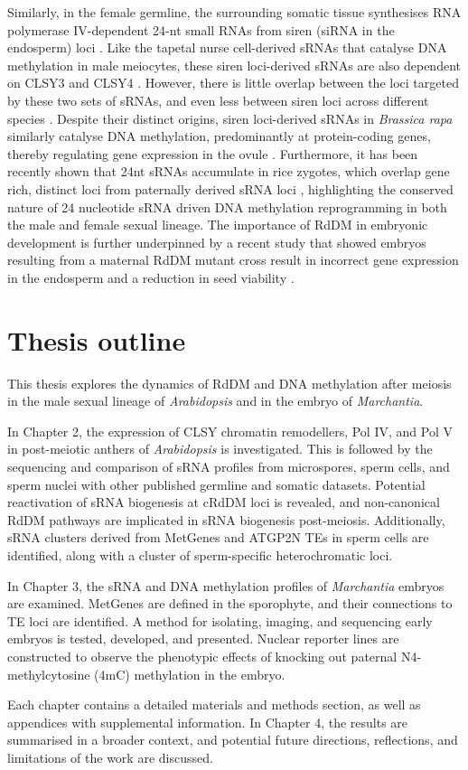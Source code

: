 Similarly, in the female germline, the surrounding somatic tissue synthesises RNA polymerase IV-dependent 24-nt small RNAs from siren (siRNA in the endosperm) loci \citep{RN164,RN163,RN162}. Like the tapetal nurse cell-derived sRNAs that catalyse DNA methylation in male meiocytes, these siren loci-derived sRNAs are also dependent on CLSY3 and CLSY4 \citep{RN162}. However, there is little overlap between the loci targeted by these two sets of sRNAs, and even less between siren loci across different species \citep{RN163}. Despite their distinct origins, siren loci-derived sRNAs in \textit{Brassica rapa} similarly catalyse DNA methylation, predominantly at protein-coding genes, thereby regulating gene expression in the ovule \citep{RN165}. Furthermore, it has been recently shown that 24nt sRNAs accumulate in rice zygotes, which overlap gene rich, distinct loci from paternally derived sRNA loci \citep{RN166}, highlighting the conserved nature of 24 nucleotide sRNA driven DNA methylation reprogramming in both the male and female sexual lineage. The importance of RdDM in embryonic development is further underpinned by a recent study that showed embryos resulting from a maternal RdDM mutant cross result in incorrect gene expression in the endosperm and a reduction in seed viability \citep{RN167}.

\section{Thesis outline}

This thesis explores the dynamics of RdDM and DNA methylation after meiosis in the male sexual lineage of \textit{Arabidopsis} and in the embryo of \textit{Marchantia}.

In Chapter 2, the expression of CLSY chromatin remodellers, Pol IV, and Pol V in post-meiotic anthers of \textit{Arabidopsis} is investigated. This is followed by the sequencing and comparison of sRNA profiles from microspores, sperm cells, and sperm nuclei with other published germline and somatic datasets. Potential reactivation of sRNA biogenesis at cRdDM loci is revealed, and non-canonical RdDM pathways are implicated in sRNA biogenesis post-meiosis. Additionally, sRNA clusters derived from MetGenes and ATGP2N TEs in sperm cells are identified, along with a cluster of sperm-specific heterochromatic loci.

In Chapter 3, the sRNA and DNA methylation profiles of \textit{Marchantia} embryos are examined. MetGenes are defined in the sporophyte, and their connections to TE loci are identified. A method for isolating, imaging, and sequencing early embryos is tested, developed, and presented. Nuclear reporter lines are constructed to observe the phenotypic effects of knocking out paternal N4-methylcytosine (4mC) methylation in the embryo.

Each chapter contains a detailed materials and methods section, as well as appendices with supplemental information. In Chapter 4, the results are summarised in a broader context, and potential future directions, reflections, and limitations of the work are discussed.

